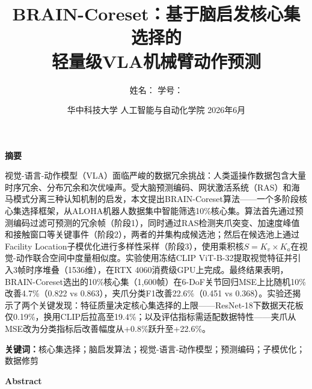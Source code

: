 \documentclass[11pt,a4paper,fontset=none]{ctexart}
\title{\textbf{BRAIN-Coreset：基于脑启发核心集选择的\\轻量级VLA机械臂动作预测}}
\author{姓名：\underline{\makebox[3cm]{}} \quad 学号：\underline{\makebox[4cm]{}}}
\date{华中科技大学 人工智能与自动化学院 \quad 2026年6月}
\begin{document}
\maketitle
\thispagestyle{empty}

\clearpage
{}  %

\begin{center}
{\large\textbf{摘\quad 要}}
\end{center}
\vspace{0.5em}

视觉-语言-动作模型（VLA）面临严峻的数据冗余挑战：人类遥操作数据包含大量时序冗余、分布冗余和次优噪声。受大脑预测编码、网状激活系统（RAS）和海马模式分离三种认知机制的启发，本文提出BRAIN-Coreset算法——一个多阶段核心集选择框架，从ALOHA机器人数据集中智能筛选10\%核心集。算法首先通过预测编码过滤可预测的冗余帧（阶段1），同时通过RAS检测夹爪突变、加速度峰值和接触窗口等关键事件（阶段2），两者的并集构成候选池；然后在候选池上通过Facility Location子模优化进行多样性采样（阶段3），使用乘积核$S=K_v\times K_a$在视觉-动作联合空间中度量相似度。实验使用冻结CLIP ViT-B-32提取视觉特征并引入3帧时序堆叠（1536维），在RTX 4060消费级GPU上完成。最终结果表明，BRAIN-Coreset选出的10\%核心集（1,600帧）在6-DoF关节回归MSE上比随机10\%改善4.7\%（0.822 vs 0.863），夹爪分类F1改善22.6\%（0.451 vs 0.368）。实验还揭示了两个关键发现：特征质量决定核心集选择的上限——ResNet-18下数据天花板仅0.19\%，换用CLIP后拉高至19.4\%；以及评估指标需适配数据特性——夹爪从MSE改为分类指标后改善幅度从+0.8\%跃升至+22.6\%。

\vspace{0.8em}
\noindent\textbf{关键词：}核心集选择；脑启发算法；视觉-语言-动作模型；预测编码；子模优化；数据修剪

\clearpage
{}
\begin{center}
{\large\textbf{Abstract}}
\end{center}
\vspace{0.5em}
\end{document}
